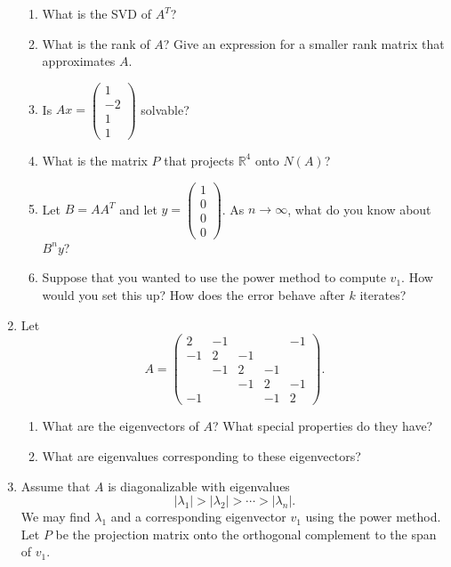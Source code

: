 \documentclass[11pt]{article}
\newcommand{\rr}{\mathbb{R}}
\begin{document}
\begin{enumerate}
\begin{enumerate}
\item What is the SVD of $A^T$?

\item What is the rank of $A$?  Give an expression for a smaller rank matrix that approximates $A$.

\item Is $Ax = \begin{pmatrix} 1 \\ -2 \\ 1 \\ 1 \end{pmatrix}$ solvable?

\item  What is the matrix $P$ that projects $\rr^4$ onto $N(A)$?

\item  Let $B = AA^T$ and let $y = \begin{pmatrix} 1 \\ 0 \\ 0 \\ 0 \end{pmatrix}$.  As $n \to \infty$, what do you know about $B^n y$?

\item Suppose that you wanted to use the power method to compute $v_1$.  How would you set this up?  How does the error behave after $k$ iterates?

\end{enumerate}


\item Let 
\[A = \begin{pmatrix} 2 & -1 & & & -1 \\-1 & 2 & -1 && \\ & -1 & 2 & -1 & \\ && -1 & 2 & -1 \\ -1&& &-1 & 2 \end{pmatrix}. \]
\begin{enumerate}

\item  What are the eigenvectors of $A$?  What special properties do they have?

\item What are eigenvalues corresponding to these eigenvectors?


\end{enumerate}


\item  Assume that $A$ is diagonalizable with eigenvalues
\[|\lambda_1| > |\lambda_2 | > \cdots > |\lambda_n|. \]
We may find $\lambda_1$ and a corresponding eigenvector $v_1$ using the power method.  Let $P$ be the projection matrix onto the orthogonal complement to the span of $v_1$.  


\end{enumerate}
\end{document}
